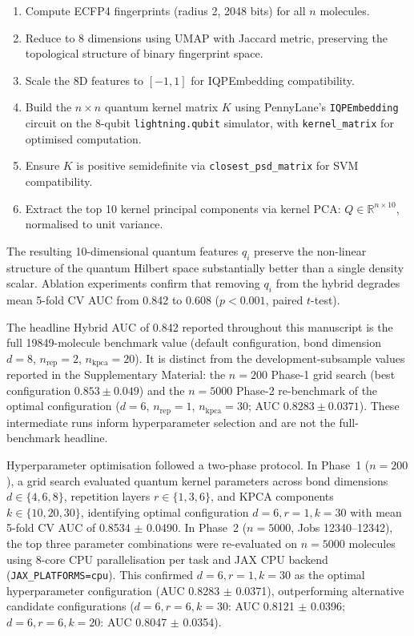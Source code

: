 \documentclass[11pt,a4paper]{article}
\begin{document}
\begin{enumerate}
\item Compute ECFP4 fingerprints (radius 2, \num{2048} bits) for all $n$ molecules.
\item Reduce to 8 dimensions using UMAP with Jaccard metric, preserving the topological structure of binary fingerprint space.
\item Scale the 8D features to $[-1, 1]$ for IQPEmbedding compatibility.
\item Build the $n \times n$ quantum kernel matrix $K$ using PennyLane's \texttt{IQPEmbedding} circuit on the 8-qubit \texttt{lightning.qubit} simulator, with \texttt{kernel\_matrix} for optimised computation.
\item Ensure $K$ is positive semidefinite via \texttt{closest\_psd\_matrix} for SVM compatibility.
\item Extract the top \num{10} kernel principal components via kernel PCA: $Q \in \mathbb{R}^{n \times 10}$, normalised to unit variance.
\end{enumerate}

The resulting 10-dimensional quantum features $q_i$ preserve the non-linear structure of the quantum Hilbert space substantially better than a single density scalar. Ablation experiments confirm that removing $q_i$ from the hybrid degrades mean 5-fold CV AUC from \num{0.842} to \num{0.608} ($p < \num{0.001}$, paired $t$-test).

The headline Hybrid AUC of \num{0.842} reported throughout this manuscript is the full \num{19849}-molecule benchmark value (default configuration, bond dimension $d = 8$, $n_{\text{rep}} = 2$, $n_{\text{kpca}} = 20$). It is distinct from the development-subsample values reported in the Supplementary Material: the $n = 200$ Phase-1 grid search (best configuration $0.853 \pm 0.049$) and the $n = 5000$ Phase-2 re-benchmark of the optimal configuration ($d = 6$, $n_{\text{rep}} = 1$, $n_{\text{kpca}} = 30$; AUC $0.8283 \pm 0.0371$). These intermediate runs inform hyperparameter selection and are not the full-benchmark headline.

Hyperparameter optimisation followed a two-phase protocol. In Phase~1 ($n = 200$), a grid search evaluated quantum kernel parameters across bond dimensions $d \in \{4, 6, 8\}$, repetition layers $r \in \{1, 3, 6\}$, and KPCA components $k \in \{10, 20, 30\}$, identifying optimal configuration $d = 6, r = 1, k = 30$ with mean 5-fold CV AUC of \num{0.8534} $\pm$ \num{0.0490}. In Phase~2 ($n = 5000$, Jobs 12340--12342), the top three parameter combinations were re-evaluated on $n = 5000$ molecules using 8-core CPU parallelisation per task and JAX CPU backend (\texttt{JAX\_PLATFORMS=cpu}). This confirmed $d = 6, r = 1, k = 30$ as the optimal hyperparameter configuration (AUC \num{0.8283} $\pm$ \num{0.0371}), outperforming alternative candidate configurations ($d=6, r=6, k=30$: AUC \num{0.8121} $\pm$ \num{0.0396}; $d=6, r=6, k=20$: AUC \num{0.8047} $\pm$ \num{0.0354}).
\end{document}

